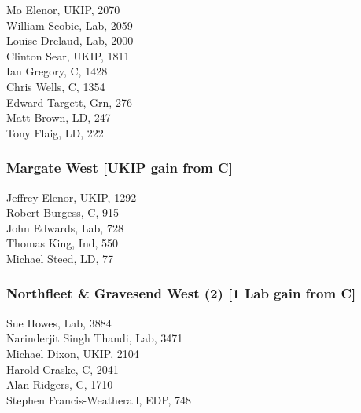 \documentclass[a4paper,openany,10pt]{book}
\begin{document}


Mo Elenor, UKIP, 2070\\
William Scobie, Lab, 2059\\
Louise Drelaud, Lab, 2000\\
Clinton Sear, UKIP, 1811\\
Ian Gregory, C, 1428\\
Chris Wells, C, 1354\\
Edward Targett, Grn, 276\\
Matt Brown, LD, 247\\
Tony Flaig, LD, 222\\


\subsubsection*{Margate West \hspace*{\fill}\nolinebreak[1]%
\enspace\hspace*{\fill}
[UKIP gain from C]}



Jeffrey Elenor, UKIP, 1292\\
Robert Burgess, C, 915\\
John Edwards, Lab, 728\\
Thomas King, Ind, 550\\
Michael Steed, LD, 77\\


\subsubsection*{Northfleet \& Gravesend West (2) \hspace*{\fill}\nolinebreak[1]%
\enspace\hspace*{\fill}
[1 Lab gain from C]}



Sue Howes, Lab, 3884\\
{Narinderjit Singh Thandi}, Lab, 3471\\
Michael Dixon, UKIP, 2104\\
Harold Craske, C, 2041\\
Alan Ridgers, C, 1710\\
{Stephen Francis-Weatherall}, EDP, 748\\
\end{document}
